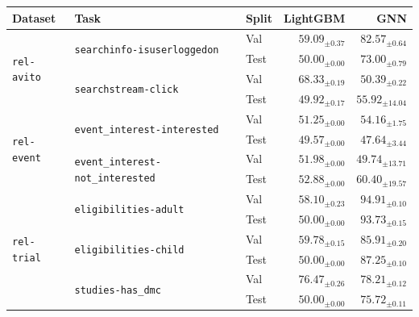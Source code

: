 \begin{tabular}{lllrr}
\toprule
Dataset & Task & Split & LightGBM & GNN \\
\midrule
\multirow[c]{4}{*}{\texttt{rel-avito}} & \multirow[c]{2}{*}{\texttt{searchinfo-isuserloggedon}} & Val & $59.09_{\pm 0.37}$ & $\bm{82.57}_{\pm 0.64}$ \\
 &  & Test & $50.00_{\pm 0.00}$ & $\bm{73.00}_{\pm 0.79}$ \\
\cmidrule{2-5}
 & \multirow[c]{2}{*}{\texttt{searchstream-click}} & Val & $\bm{68.33}_{\pm 0.19}$ & $50.39_{\pm 0.22}$ \\
 &  & Test & $49.92_{\pm 0.17}$ & $\bm{55.92}_{\pm 14.04}$ \\
\cmidrule{1-5} \cmidrule{2-5}
\multirow[c]{4}{*}{\texttt{rel-event}} & \multirow[c]{2}{*}{\texttt{event\_interest-interested}} & Val & $51.25_{\pm 0.00}$ & $\bm{54.16}_{\pm 1.75}$ \\
 &  & Test & $49.57_{\pm 0.00}$ & $47.64_{\pm 3.44}$ \\
\cmidrule{2-5}
 & \multirow[c]{2}{*}{\texttt{event\_interest-not\_interested}} & Val & $51.98_{\pm 0.00}$ & $49.74_{\pm 13.71}$ \\
 &  & Test & $52.88_{\pm 0.00}$ & $\bm{60.40}_{\pm 19.57}$ \\
\cmidrule{1-5} \cmidrule{2-5}
\multirow[c]{6}{*}{\texttt{rel-trial}} & \multirow[c]{2}{*}{\texttt{eligibilities-adult}} & Val & $58.10_{\pm 0.23}$ & $\bm{94.91}_{\pm 0.10}$ \\
 &  & Test & $50.00_{\pm 0.00}$ & $\bm{93.73}_{\pm 0.15}$ \\
\cmidrule{2-5}
 & \multirow[c]{2}{*}{\texttt{eligibilities-child}} & Val & $59.78_{\pm 0.15}$ & $\bm{85.91}_{\pm 0.20}$ \\
 &  & Test & $50.00_{\pm 0.00}$ & $\bm{87.25}_{\pm 0.10}$ \\
\cmidrule{2-5}
 & \multirow[c]{2}{*}{\texttt{studies-has\_dmc}} & Val & $76.47_{\pm 0.26}$ & $\bm{78.21}_{\pm 0.12}$ \\
 &  & Test & $50.00_{\pm 0.00}$ & $\bm{75.72}_{\pm 0.11}$ \\
\bottomrule
\end{tabular}

